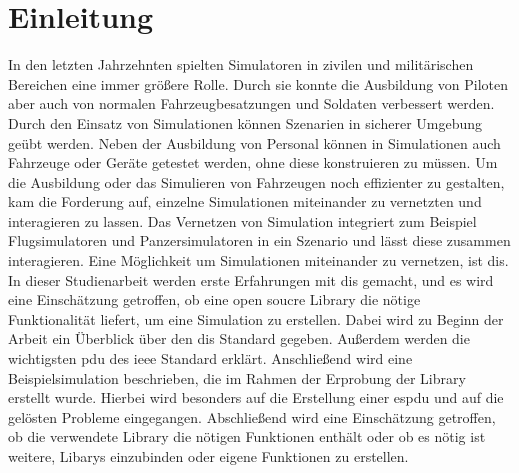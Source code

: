 \chapter{Einleitung}\label{Einleitung}
\onehalfspacing
In den letzten Jahrzehnten spielten Simulatoren in zivilen und militärischen Bereichen eine immer größere Rolle. Durch sie konnte die Ausbildung von Piloten aber auch von normalen Fahrzeugbesatzungen und Soldaten verbessert werden. Durch den Einsatz von Simulationen können Szenarien in sicherer Umgebung geübt werden. Neben der Ausbildung von Personal können in Simulationen auch Fahrzeuge oder Geräte getestet werden, ohne diese konstruieren zu müssen. 
Um die Ausbildung oder das Simulieren von Fahrzeugen noch effizienter zu gestalten, kam die Forderung auf, einzelne Simulationen miteinander zu vernetzten und interagieren zu lassen. Das Vernetzen von Simulation integriert zum Beispiel Flugsimulatoren und Panzersimulatoren in ein Szenario und lässt diese zusammen interagieren. 
Eine Möglichkeit um Simulationen miteinander zu vernetzen, ist \ac{dis}.
\\ In dieser Studienarbeit werden erste Erfahrungen mit \ac{dis} gemacht, und es wird eine Einschätzung getroffen, ob eine open soucre Library die nötige Funktionalität  liefert, um eine Simulation zu erstellen. Dabei wird zu Beginn  der Arbeit ein Überblick über den \ac{dis} Standard gegeben. Außerdem werden die wichtigsten \ac{pdu} des \ac{ieee} Standard erklärt.    Anschließend wird eine Beispielsimulation beschrieben, die im Rahmen der Erprobung der Library erstellt wurde. Hierbei wird besonders auf die Erstellung einer \acl{espdu} und auf die gelösten Probleme eingegangen.
Abschließend wird eine Einschätzung getroffen, ob die verwendete Library die nötigen Funktionen enthält oder ob es nötig ist weitere, Libarys einzubinden oder eigene Funktionen zu erstellen.        